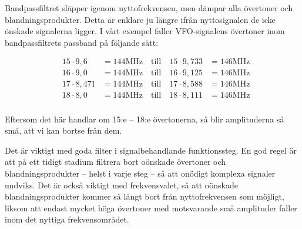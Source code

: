 Bandpassfiltret släpper igenom nyttofrekvensen, men dämpar alla övertoner och
blandningsprodukter.
Detta är enklare ju längre ifrån nyttosignalen de icke önskade signalerna
ligger.
I vårt exempel faller VFO-signalens övertoner inom bandpassfiltrets passband
på följande sätt:

\begin{align*}
  &15 \cdot 9,6   &= 144 \text{MHz} \quad \text{till} \quad 15 \cdot 9,733 &= 146 \text{MHz} \\
  &16 \cdot 9,0   &= 144 \text{MHz} \quad \text{till} \quad 16 \cdot 9,125 &= 146 \text{MHz} \\
  &17 \cdot 8,471 &= 144 \text{MHz} \quad \text{till} \quad 17 \cdot 8,588 &= 146 \text{MHz} \\
  &18 \cdot 8,0   &= 144 \text{MHz} \quad \text{till} \quad 18 \cdot 8,111 &= 146 \text{MHz} \\
\end{align*}


Eftersom det här handlar om 15:e -- 18:e övertonerna, så blir
amplituderna så små, att vi kan bortse från dem.

Det är viktigt med goda filter i signalbehandlande funktionssteg.
En god regel är att på ett tidigt stadium filtrera bort oönskade
övertoner och blandningsprodukter -- helst i varje steg -- så att
onödigt komplexa signaler undviks.
Det är också viktigt med frekvensvalet, så att oönskade blandningsprodukter
kommer så långt bort från nyttofrekvensen som möjligt, liksom att endast mycket
höga övertoner med motsvarande små amplituder faller inom det nyttiga
frekvensområdet.
